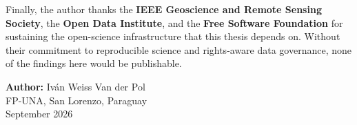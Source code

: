 Finally, the author thanks the \textbf{IEEE Geoscience and Remote
Sensing Society}, the \textbf{Open Data Institute}, and the
\textbf{Free Software Foundation} for sustaining the open-science
infrastructure that this thesis depends on. Without their
commitment to reproducible science and rights-aware data governance,
none of the findings here would be publishable.

\textbf{Author:} Iván Weiss Van der Pol \\
FP-UNA, San Lorenzo, Paraguay \\
September 2026
